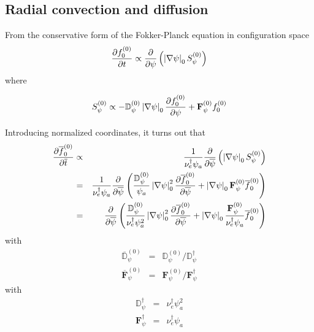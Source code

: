 \subsection{Radial convection and diffusion}

From the conservative form of the Fokker-Planck equation in configuration
space 
\begin{equation}
\frac{\partial f_{0}^{\left( 0\right) }}{\partial t}\propto \frac{\partial }{%
\partial \psi }\left( \left| \nabla \psi \right| _{0}S_{\psi }^{\left(
0\right) }\right)
\end{equation}
where

\begin{equation}
S_{\psi }^{\left( 0\right) }\propto -\mathbb{D}_{\psi }^{\left( 0\right)
}\left| \nabla \psi \right| _{0}\frac{\partial f_{0}^{\left( 0\right) }}{%
\partial \psi }+\mathbf{F}_{\psi }^{\left( 0\right) }f_{0}^{\left( 0\right) }
\end{equation}

Introducing normalized coordinates, it turns out that 
\begin{eqnarray}
\frac{\partial \overline{f}_{0}^{\left( 0\right) }}{\partial \overline{t}}
&\propto &\frac{1}{\nu _{e}^{\dag }\psi _{a}}\frac{\partial }{\partial 
\overline{\psi }}\left( \left| \nabla \psi \right| _{0}S_{\psi }^{\left(
0\right) }\right)  \notag \\
&=&\frac{1}{\nu _{e}^{\dag }\psi _{a}}\frac{\partial }{\partial \overline{
\psi }}\left( \frac{\mathbb{D}_{\psi }^{\left( 0\right) }}{\psi _{a}}\left|
\nabla \psi \right| _{0}^{2}\frac{\partial \overline{f}_{0}^{\left( 0\right)
}}{\partial \overline{\psi }}+\left| \nabla \psi \right| _{0}\mathbf{F}
_{\psi }^{\left( 0\right) }\overline{f}_{0}^{\left( 0\right) }\right)  \notag
\\
&=&\frac{\partial }{\partial \overline{\psi }}\left( \frac{\mathbb{D}_{\psi
}^{\left( 0\right) }}{\nu _{e}^{\dag }\psi _{a}^{2}}\left| \nabla \psi
\right| _{0}^{2}\frac{\partial \overline{f}_{0}^{\left( 0\right) }}{\partial 
\overline{\psi }}+\left| \nabla \psi \right| _{0}\frac{\mathbf{F}_{\psi
}^{\left( 0\right) }}{\nu _{e}^{\dag }\psi _{a}}\overline{f}_{0}^{\left(
0\right) }\right)
\end{eqnarray}
with 
\begin{eqnarray}
\overline{\mathbb{D}}_{\psi }^{\left( 0\right) } &=&\mathbb{D}_{\psi
}^{\left( 0\right) }/\mathbb{D}_{\psi }^{\dag } \\
\overline{\mathbf{F}}_{\psi }^{\left( 0\right) } &=&\mathbf{F}_{\psi
}^{\left( 0\right) }/\mathbf{F}_{\psi }^{\dag }
\end{eqnarray}
with 
\begin{eqnarray}
\mathbb{D}_{\psi }^{\dag } &=&\nu _{e}^{\dag }\psi _{a}^{2} \\
\mathbf{F}_{\psi }^{\dag } &=&\nu _{e}^{\dag }\psi _{a}
\end{eqnarray}


